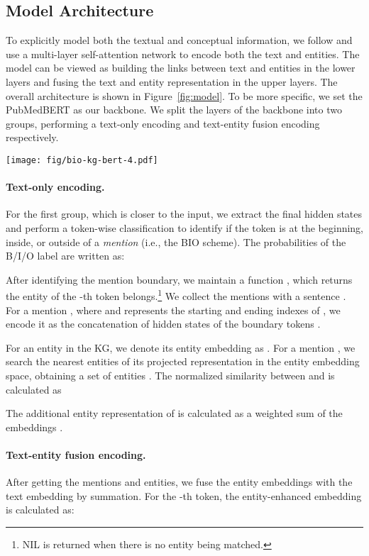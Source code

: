 \documentclass[11pt]{article}
\begin{document}
\subsection{Model Architecture}
To explicitly model both the textual and conceptual information,
we follow \citet{fevry-etal-2020-entities} and 
use a multi-layer self-attention network to encode both the text and entities.
The model
can be viewed as
building the links between text and entities
in the lower layers and
fusing the text and entity representation in the upper layers.
The overall architecture is shown in Figure~\ref{fig:model}.
To be more specific,
we set the PubMedBERT \cite{gu2020domain}
as our backbone.
We split the layers of the backbone into two groups,
performing a text-only encoding and text-entity fusion encoding
respectively.

\begin{figure*}[t]
\centering
\texttt{[image: fig/bio-kg-bert-4.pdf]}
\caption{The overall architecture of KeBioLM.}
\label{fig:model}
\end{figure*}


\paragraph{Text-only encoding.}
For the first group, which is closer to the input,
we extract the final hidden states
and perform a token-wise classification
to identify if the token is at the beginning, inside, or outside of a \textit{mention} (i.e., the BIO scheme).
The probabilities of the B/I/O label  are written as:

After identifying the mention boundary,
we maintain a function ,
which returns the entity of the -th token belongs.\footnote{NIL is returned when there is no entity being matched.}
We collect the mentions with a sentence .
For a mention , where  and  represents the starting and ending indexes
of ,
we encode it
as the concatenation of hidden states of the boundary tokens .

For an entity  in the KG,
we denote its entity embedding as .
For a mention , we search
the  nearest entities
of its projected representation   
in the entity embedding space,
obtaining a set of entities .
The normalized similarity between  and 
is calculated as

The additional entity representation  of 
is calculated as a weighted sum
of the embeddings .


\paragraph{Text-entity fusion encoding.}
After getting the mentions
and entities,
we fuse the entity embeddings with the text embedding by summation.
For the -th token,
the entity-enhanced embedding is calculated
as:
\end{document}
